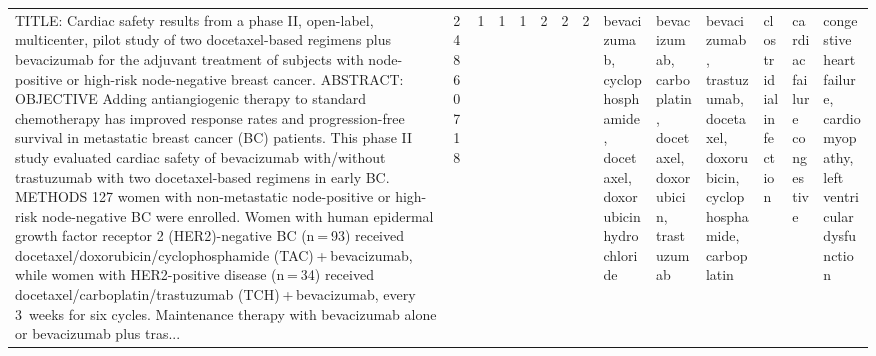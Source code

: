 \begin{longtable}{llllllllllllll}
TITLE: Cardiac safety results from a phase II, open-label, multicenter, pilot study of two docetaxel-based regimens plus bevacizumab for the adjuvant treatment of subjects with node-positive or high-risk node-negative breast cancer. ABSTRACT: OBJECTIVE Adding antiangiogenic therapy to standard chemotherapy has improved response rates and progression-free survival in metastatic breast cancer (BC) patients. This phase II study evaluated cardiac safety of bevacizumab with/without trastuzumab with two docetaxel-based regimens in early BC.  METHODS 127 women with non-metastatic node-positive or high-risk node-negative BC were enrolled. Women with human epidermal growth factor receptor 2 (HER2)-negative BC (n = 93) received docetaxel/doxorubicin/cyclophosphamide (TAC) + bevacizumab, while women with HER2-positive disease (n = 34) received docetaxel/carboplatin/trastuzumab (TCH) + bevacizumab, every 3 weeks for six cycles. Maintenance therapy with bevacizumab alone or bevacizumab plus tras... & 24860718 &              1 &                     1 &             1 &                 2 &                        2 &                2 &                                                                                                                                                                                             bevacizumab, cyclophosphamide, docetaxel, doxorubicin hydrochloride &                                                     bevacizumab, carboplatin, docetaxel, doxorubicin, trastuzumab &                                                                                                                                        bevacizumab, trastuzumab, docetaxel, doxorubicin, cyclophosphamide, carboplatin &                                                                                                                                            clostridial infection &                                                                                                                                                                                                                                        cardiac failure congestive &                                        congestive heart failure, cardiomyopathy, left ventricular dysfunction \\

\end{longtable}
